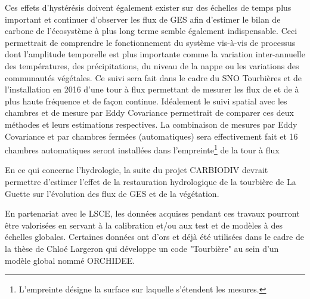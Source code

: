 Ces effets d'hystérésis doivent également exister sur des échelles de temps plus important et continuer d'observer les flux de GES afin d'estimer le bilan de carbone de l'écosystème à plus long terme semble également indispensable.
Ceci permettrait de comprendre le fonctionnement du système vis-à-vis de processus dont l'amplitude temporelle est plus importante comme la variation inter-annuelle des températures, des précipitations, du niveau de la nappe ou les variations des communautés végétales.
Ce suivi sera fait dans le cadre du SNO Tourbières et de l'installation en 2016 d'une tour à flux permettant de mesurer les flux de \coo et de \chh à plus haute fréquence et de façon continue.
Idéalement le suivi spatial avec les chambres et de mesure par Eddy Covariance permettrait de comparer ces deux méthodes et leurs estimations respectives. 
La combinaison de mesures par Eddy Covariance et par chambres fermées (automatiques) sera effectivement fait et 16 chambres automatiques seront installées dans l'empreinte\footnote{L'empreinte désigne la surface sur laquelle s'étendent les mesures.} de la tour à flux

En ce qui concerne l'hydrologie, la suite du projet CARBIODIV devrait permettre d'estimer l'effet de la restauration hydrologique de la tourbière de La Guette sur l'évolution des flux de GES et de la végétation.

En partenariat avec le LSCE, les données acquises pendant ces travaux pourront être valorisées en servant à la calibration et/ou aux test et de modèles à des échelles globales.
Certaines données ont d'ors et déjà été utilisées dans le cadre de la thèse de Chloé Largeron qui développe un code "Tourbière" au sein d'un modèle global nommé ORCHIDEE.







%
%
%
%


%
%


